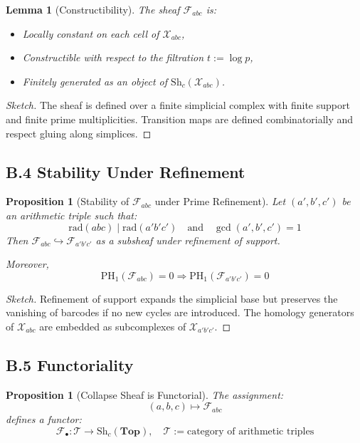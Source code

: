 \documentclass[11pt]{article}
\newtheorem{lemma}[theorem]{Lemma}
\newtheorem{proposition}[theorem]{Proposition}
\begin{document}
\begin{lemma}[Constructibility]
The sheaf \( \mathcal{F}_{abc} \) is:
\begin{itemize}
  \item Locally constant on each cell of \( \mathcal{X}_{abc} \),
  \item Constructible with respect to the filtration \( t := \log p \),
  \item Finitely generated as an object of \( \mathrm{Sh}_c(\mathcal{X}_{abc}) \).
\end{itemize}
\end{lemma}

\begin{proof}[Sketch]
The sheaf is defined over a finite simplicial complex with finite support and finite prime multiplicities.  
Transition maps are defined combinatorially and respect gluing along simplices.
\end{proof}

\subsection*{B.4 Stability Under Refinement}

\begin{proposition}[Stability of \( \mathcal{F}_{abc} \) under Prime Refinement]
Let \( (a',b',c') \) be an arithmetic triple such that:
\[
\mathrm{rad}(abc) \mid \mathrm{rad}(a'b'c') \quad \text{and} \quad \gcd(a',b',c')=1
\]
Then \( \mathcal{F}_{abc} \hookrightarrow \mathcal{F}_{a'b'c'} \) as a subsheaf under refinement of support.

Moreover,
\[
\mathrm{PH}_1(\mathcal{F}_{abc}) = 0 \Rightarrow \mathrm{PH}_1(\mathcal{F}_{a'b'c'}) = 0
\]
\end{proposition}

\begin{proof}[Sketch]
Refinement of support expands the simplicial base but preserves the vanishing of barcodes if no new cycles are introduced.  
The homology generators of \( \mathcal{X}_{abc} \) are embedded as subcomplexes of \( \mathcal{X}_{a'b'c'} \).
\end{proof}

\subsection*{B.5 Functoriality}

\begin{proposition}[Collapse Sheaf is Functorial]
The assignment:
\[
(a,b,c) \mapsto \mathcal{F}_{abc}
\]
defines a functor:
\[
\mathcal{F}_\bullet : \mathcal{T} \to \mathrm{Sh}_c(\mathbf{Top}), \quad \mathcal{T} := \text{category of arithmetic triples}
\]
\end{proposition}
\end{document}
